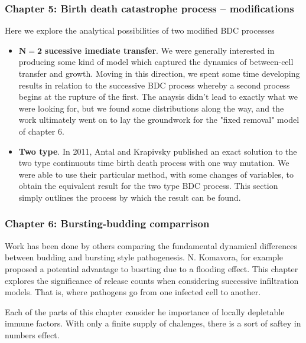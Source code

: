 \subsubsection{Chapter 5: Birth death catastrophe process -- modifications}

Here we explore the analytical possibilities of two modified BDC processes
\begin{itemize}
\item $\mathbf{N = 2}$ \textbf{sucessive imediate transfer}. We were generally interested in producing some kind of model which captured the dynamics of between-cell transfer and growth.  Moving in this direction,  we spent some time developing results in relation to the successive BDC process whereby a second process begins at the rupture of the first.  The anaysis didn't lead to exactly what we were looking for, but we found some distributions along the way,  and the work ultimately went on to lay the groundwork for the "fixed removal" model of chapter 6.   


\item \textbf{Two type}.  In 2011,  Antal and Krapivsky \cite{antal2011exact} published an exact solution to the two type continuouts time birth death process with one way mutation.  We were able to use their particular method, with some changes of variables,  to obtain the equivalent result for the two type BDC process.  This section simply outlines the process by which the result can be found. 


\end{itemize}


\subsubsection{Chapter 6: Bursting-budding comparrison}


Work has been done by others \cite{komarova2007viral} \cite{yuan2011stochastic} \cite{pearson2011stochastic} \cite{capistran2018extracellular} comparing the fundamental dynamical differences between budding and bursting style pathogenesis.  N. Komavora, for example proposed a potential advantage to busrting due to a flooding effect.  This chapter explores the significance of release counts when considering successive infiltration models.  That is, where pathogens go from one infected cell to another. \par
Each of the parts of this chapter consider he importance of locally depletable immune factors.  With only a finite supply of chalenges,  there is a sort of saftey in numbers effect.


